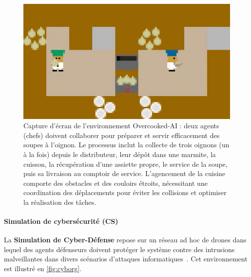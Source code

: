 \documentclass[pdflatex,sn-mathphys-num]{sn-jnl}%
\theoremstyle{thmstyleone}%
\theoremstyle{thmstyletwo}%
\theoremstyle{thmstylethree}%
\begin{document}
\begin{figure}[h!]
    \centering
    \includegraphics[width=0.6\linewidth]{figures/overcooked.png}
    \caption{Capture d'écran de l'environnement Overcooked-AI : deux agents (chefs) doivent collaborer pour préparer et servir efficacement des soupes à l'oignon. Le processus inclut la collecte de trois oignons (un à la fois) depuis le distributeur, leur dépôt dans une marmite, la cuisson, la récupération d'une assiette propre, le service de la soupe, puis sa livraison au comptoir de service. L'agencement de la cuisine comporte des obstacles et des couloirs étroits, nécessitant une coordination des déplacements pour éviter les collisions et optimiser la réalisation des tâches.}
    \label{fig:overcooked}
\end{figure}

\paragraph{Simulation de cybersécurité (CS)}

La \textbf{Simulation de Cyber-Défense} repose sur un réseau ad hoc de drones dans lequel des agents défenseurs doivent protéger le système contre des intrusions malveillantes dans divers scénarios d'attaques informatiques~\cite{Maxwell2021}. Cet environnement est illustré en \autoref{fig:cyborg}.
\end{document}
